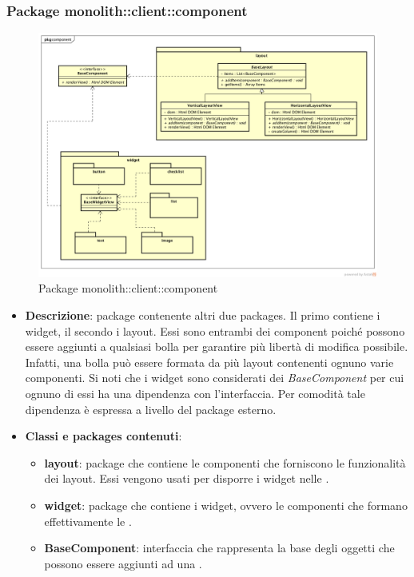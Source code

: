 \subsubsection{Package monolith::client::component}
\label{Package monolith::client::component}
\begin{figure}[H]
	\centering
	\includegraphics[width=\textwidth]{Sezioni/Packages/SDK/component.png}
	\caption{Package monolith::client::component}
\end{figure}

\begin{itemize}
\item \textbf{Descrizione}: package contenente altri due packages. Il primo contiene i widget, il secondo i layout. Essi sono entrambi dei component poiché possono essere aggiunti a qualsiasi bolla per garantire più libertà di modifica possibile. Infatti, una bolla può essere formata da più layout contenenti ognuno varie componenti.
Si noti che i widget sono considerati dei \textit{BaseComponent} per cui ognuno di essi ha una dipendenza con l'interfaccia. Per comodità tale dipendenza è espressa a livello del package esterno.
\item \textbf{Classi e packages contenuti}:
\begin{itemize}
\item \textbf{layout}: package che contiene le componenti che forniscono le funzionalità dei layout. Essi vengono usati per disporre i widget nelle .
\item \textbf{widget}: package che contiene i widget, ovvero le componenti che formano effettivamente le .
\item \textbf{BaseComponent}: interfaccia che rappresenta la base degli oggetti che possono essere aggiunti ad una .
\end{itemize}
\end{itemize}

